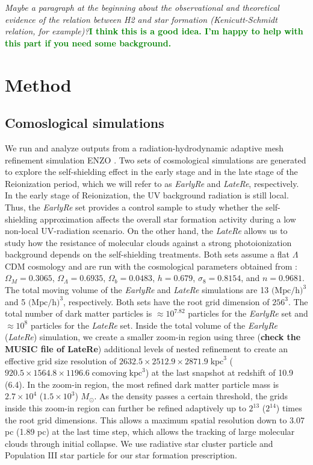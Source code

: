 \documentclass[linenumbers, twocolumn]{aastex631}
\newcommand{\acorr}[1]{\textbf{\textcolor{green}{#1}}}
\begin{document}
\textit{Maybe a paragraph at the beginning about the observational and theoretical evidence of the relation between H2 and star formation (Kenicutt-Schmidt relation, for example)?}\acorr{I think this is a good idea. I'm happy to help with this part if you need some background.}


\section{Method} \label{sec:method}
\subsection{Comoslogical simulations}
We run and analyze outputs from a radiation-hydrodynamic adaptive mesh refinement simulation ENZO \citep{Bryan+2014}. Two sets of cosmological simulations are generated to explore the self-shielding effect in the early stage and in the late stage of the Reionization period, which we will refer to as \textit{EarlyRe} and \textit{LateRe}, respectively. In the early stage of Reionization, the UV background radiation is still local. Thus, the \textit{EarlyRe} set provides a control sample to study whether the self-shielding approximation affects the overall star formation activity during a low non-local UV-radiation scenario. On the other hand, the \textit{LateRe} allows us to study how the resistance of molecular clouds against a strong photoionization background depends on the self-shielding treatments. Both sets assume a flat $\Lambda$CDM cosmology and are run with the cosmological parameters obtained from \cite{PlanckCollaboration+2016}: $\Omega_{M} = 0.3065$, $\Omega_{\Lambda} = 0.6935$, $\Omega_{b} = 0.0483$, $h = 0.679$, $\sigma_{8} = 0.8154$, and $n = 0.9681$. The total moving volume of the \textit{EarlyRe} and \textit{LateRe} simulations are 13 $\text{(Mpc/h)}^{3}$ and 5 $\text{(Mpc/h)}^{3}$, respectively. Both sets have the root grid dimension of $256^{3}$. The total number of dark matter particles is $\approx 10^{7.82}$ particles for the \textit{EarlyRe} set and $\approx 10^{8}$ particles for the \textit{LateRe} set. Inside the total volume of the \textit{EarlyRe} (\textit{LateRe}) simulation, we create a smaller zoom-in region using three (\textbf{check the MUSIC file of LateRe}) additional levels of nested refinement to create an effective grid size resolution of $2632.5 \times 2512.9 \times 2871.9 \; \text{kpc}^{3}$ ($920.5 \times 1564.8 \times 1196.6 \; \text{comoving} \; \text{kpc}^{3}$) at the last snapshot at redshift of 10.9 (6.4). In the zoom-in region, the most refined dark matter particle mass is $2.7\times 10^{4}$ ($1.5\times 10^{3}$) $M_\odot$. As the density passes a certain threshold, the grids inside this zoom-in region can further be refined adaptively up to $2^{13}$ ($2^{14}$) times the root grid dimensions. This allows a maximum spatial resolution down to 3.07 pc (1.89 pc) at the last time step, which allows the tracking of large molecular clouds through initial collapse. We use radiative star cluster particle \citep{Wise+2009} and Population III star particle \citep{Abel+2007} for our star formation prescription. 
\end{document}
